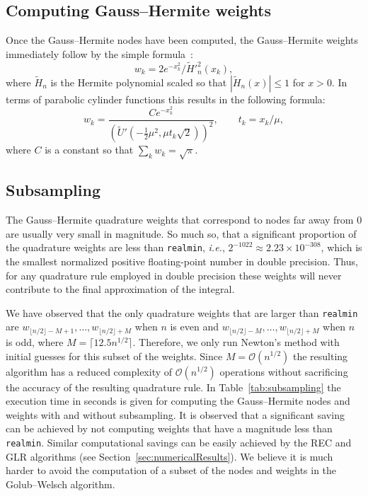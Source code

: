 \documentclass[final]{siamltex}
\begin{document}
\subsection{Computing Gauss--Hermite weights} 
Once the Gauss--Hermite nodes have been computed, the Gauss--Hermite weights immediately follow by the simple formula~\cite[(40)]{Glaser_07_01}: 
\[
w_k = 2e^{-x_k^2} / \tilde{H}'^2_n(x_k),
\]
where $\tilde{H}_n$ is the Hermite polynomial scaled so that $|\tilde{H}_n(x)|\leq1$ for $x>0$. In terms of parabolic cylinder functions
this results in the following formula: 
\begin{equation}
w_k = \frac{Ce^{-x_k^2}}{\left(\tilde{U}'\left(-\frac{1}{2}\mu^2,\mu t_k \sqrt{2}\right)\right)^2}, \qquad t_k = x_k/\mu,
\label{eq:weightFormula}
\end{equation}
where $C$ is a constant so that $\sum_k w_k = \sqrt{\pi}$.

\subsection{Subsampling}\label{subsec:GHsubsampling} 
The Gauss--Hermite quadrature weights that correspond to nodes far away from $0$ are usually 
very small in magnitude. So much so, that a significant proportion of the quadrature weights 
are less than {\tt realmin}, \emph{i.e.}, $2^{-1022} \approx 2.23\times 10^{-308}$, which is the smallest normalized positive 
floating-point number in double precision. Thus, for any quadrature rule employed in double precision these weights 
will never contribute to the final approximation of the integral.  

We have observed that the only quadrature weights that are larger than {\tt realmin} are $w_{\lfloor n/2\rfloor-M+1},\ldots,w_{\lfloor n/2\rfloor+M}$ when $n$ is even and  $w_{\lfloor n/2\rfloor-M},\ldots,w_{\lfloor n/2\rfloor+M}$ when $n$ is odd, where $M=\lceil 12.5 n^{1/2}\rceil$.  
Therefore, we only run Newton's method with initial guesses for this subset of the weights. Since 
$M=\mathcal{O}(n^{1/2})$ the resulting algorithm has a reduced complexity 
of $\mathcal{O}(n^{1/2})$ operations without sacrificing the accuracy of the resulting quadrature rule. In Table~\ref{tab:subsampling}
the execution time in seconds is given for computing the Gauss--Hermite nodes and weights with and without subsampling. 
It is observed that a significant saving can be achieved by not computing weights that have a magnitude less than {\tt realmin}.  
Similar computational savings can be easily achieved by the REC and GLR algorithms (see Section~\ref{sec:numericalResults}). 
We believe it is much harder to avoid the computation of a subset of the nodes and weights in the Golub--Welsch algorithm. 
\end{document}
